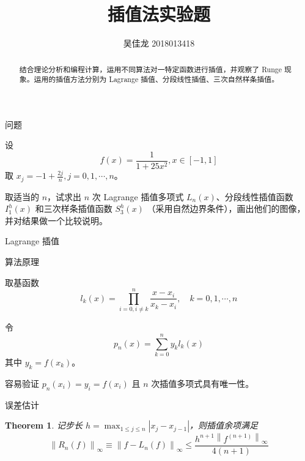 \documentclass[a4paper]{article}
\providecommand{\keywords}[1]{\textbf{\textit{关键词}} #1}
\newtheorem{myThm}{Theorem}
\begin{document}
 
\title{插值法实验题}
\author{吴佳龙 2018013418}
\date{}
\maketitle

\begin{abstract}
	结合理论分析和编程计算，运用不同算法对一特定函数进行插值，并观察了 Runge 现象。运用的插值方法分别为 Lagrange 插值、分段线性插值、三次自然样条插值。
\end{abstract}


\begin{multicols}{2}

\begin{section}{问题}

	设 $$f(x)=\frac{1}{1+25 x^{2}}, x \in[-1,1]$$ 取 $x_{j}=-1+\frac{2 j}{n}, j=0,1, \cdots, n$。
	
	取适当的 $n$，试求出 $n$ 次 Lagrange 插值多项式 $L_n(x)$、分段线性插值函数 $I_1^h(x)$ 和三次样条插值函数 $S_3^h(x)$ （采用自然边界条件），画出他们的图像，并对结果做一个比较说明。

\end{section}

\begin{section}{Lagrange 插值}
	
	\begin{subsection}{算法原理}
		
		取基函数 $$l_{k}(x)=\prod_{i=0, i \neq k}^{n} \frac{x-x_{i}}{x_{k}-x_{i}}, \quad k=0,1, \cdots, n$$
		
		令 $$p_{n}(x)=\sum_{k=0}^{n} y_{k} l_{k}(x)$$ 其中 $y_{k}=f\left(x_{k}\right)$。
		
		容易验证 $p_{n}\left(x_{i}\right)=y_{i}=f\left(x_{i}\right)$ 且 $n$ 次插值多项式具有唯一性。
		
		\begin{subsubsection}{误差估计}
			
			\begin{myThm}
				
				记步长 $ h=\max _{1 \leq j \leq n}\left|x_{j}-x_{j-1}\right| $，则插值余项满足 $$\left\|R_{n}(f)\right\|_{\infty} \equiv\left\|f-L_{n}(f)\right\|_{\infty} \leq \frac{h^{n+1} \left\|f^{(n+1)}\right\|_{\infty}}{4(n+1)}$$
				
			\end{myThm}
			
		\end{subsubsection}
		

\end{subsection}
\end{section}
\end{multicols}
\end{document}

